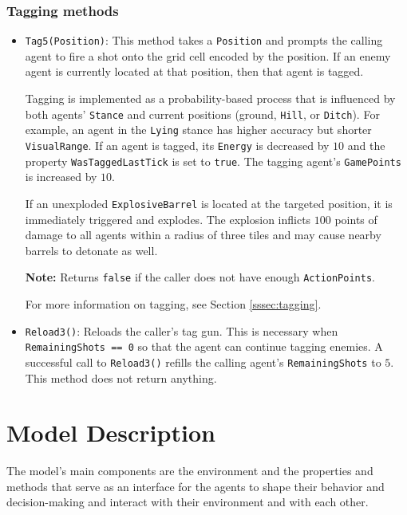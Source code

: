 \documentclass[a4paper,english,DIV=16,11pt,parskip=half,dvipsnames,listof=totoc,index=totoc,bibliography=totoc]{scrartcl}
\begin{document}
\subsubsection{Tagging methods} \label{sssec:tagMeth}
\begin{itemize}
  \item \texttt{Tag5(Position)}: This method takes a \texttt{Position} and prompts the calling agent to fire a shot onto the grid cell encoded by the position. If an enemy agent is currently located at that position, then that agent is tagged.

  Tagging is implemented as a probability-based process that is influenced by both agents' \texttt{Stance} and current positions (ground, \texttt{Hill}, or \texttt{Ditch}). For example, an agent in the \texttt{Lying} stance has higher accuracy but shorter \texttt{VisualRange}. If an agent is tagged, its \texttt{Energy} is decreased by $10$ and the property \texttt{WasTaggedLastTick} is set to \texttt{true}. The tagging agent's \texttt{GamePoints} is increased by $10$.

  If an unexploded \texttt{ExplosiveBarrel} is located at the targeted position, it is immediately triggered and explodes. The explosion inflicts $100$ points of damage to all agents within a radius of three tiles and may cause nearby barrels to detonate as well.

  \faLightbulbO\: \textbf{Note:} Returns \texttt{false} if the caller does not have enough \texttt{ActionPoints}.

  For more information on tagging, see Section \ref{sssec:tagging}.

  \item \texttt{Reload3()}: Reloads the caller's tag gun. This is necessary when \texttt{RemainingShots == 0} so that the agent can continue tagging enemies. A successful call to \texttt{Reload3()} refills the calling agent's \texttt{RemainingShots} to $5$. This method does not return anything.

\end{itemize}
%
%
\section{Model Description} \label{sec:modelDesc}
The model's main components are the environment and the properties and methods that serve as an interface for the agents to shape their behavior and decision-making and interact with their environment and with each other.
%
\end{document}
